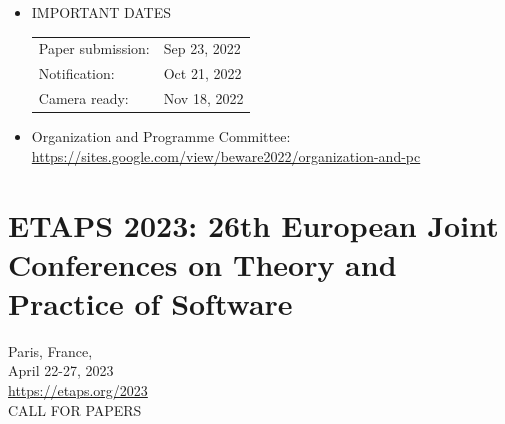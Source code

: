 \documentclass[prodmode,acmtecs]{acmsmall} %
\begin{document}
\begin{itemize}
\item  IMPORTANT DATES 
 
\begin{tabulary}{\linewidth}{LL}Paper submission:  & Sep 23, 2022 \\
Notification:  & Oct 21, 2022 \\
Camera ready:  & Nov 18, 2022 \\
\end{tabulary}
 
\item  Organization and Programme Committee: \href{https://sites.google.com/view/beware2022/organization-and-pc}{https://sites.google.com/view/beware2022/organization-and-pc}   
 
\end{itemize}\section{ETAPS 2023: 26th European Joint Conferences on Theory and Practice of Software }\label{ETAPS2023}  Paris, France,  \\ 
  April 22-27, 2023\\ 
  \href{https://etaps.org/2023}{https://etaps.org/2023}\\ 
CALL FOR PAPERS 
\end{document}
